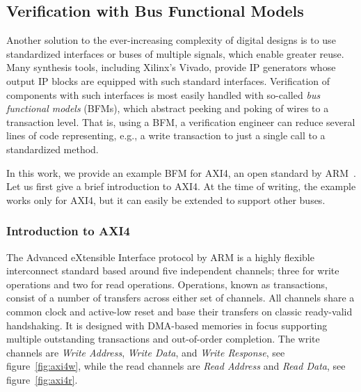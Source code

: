 \documentclass[conference]{IEEEtran}
\begin{document}
\subsection{Verification with Bus Functional Models}
Another solution to the ever-increasing complexity of digital designs is to use standardized interfaces or buses of multiple signals, which enable greater reuse. 
Many synthesis tools, including Xilinx's Vivado, provide IP generators whose output IP blocks are equipped with such standard interfaces. Verification of components 
with such interfaces is most easily handled with so-called \textit{bus functional models} (BFMs), which abstract peeking and poking of wires to a transaction level. That is, 
using a BFM, a verification engineer can reduce several lines of code representing, e.g., a write transaction to just a single call to a standardized method.

In this work, we provide an example BFM for AXI4, an open standard by ARM~\cite{axi4standard}. Let us first give a brief introduction to AXI4. At the time of writing, the example works only for AXI4, but it can easily be extended to support other buses.

\subsubsection{Introduction to AXI4}
The Advanced eXtensible Interface protocol by ARM is a highly flexible interconnect standard based around five independent channels; three for write operations and two for read operations. Operations, known as transactions, consist of a number of transfers across either set of channels. All channels share a common clock and active-low reset and base their transfers on classic ready-valid handshaking. It is designed with DMA-based memories in focus supporting multiple outstanding transactions and out-of-order completion. The write channels are \textit{Write Address}, \textit{Write Data}, and \textit{Write Response}, see figure~\ref{fig:axi4w}, while the read channels are \textit{Read Address} and \textit{Read Data}, see figure~\ref{fig:axi4r}. 
\end{document}
